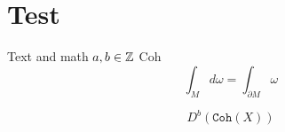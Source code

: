 \section{Test}
Text and math $a, b \in \mathbb Z$ Coh
\[
\int_{M} d\omega = \int_{\partial M } \omega
\]

\[
    D^b(\mathtt{Coh}(X))
\]